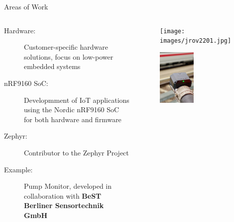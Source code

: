 \documentclass[10pt, aspectratio=169]{beamer}
\begin{document}
\begin{frame}[fragile]{Areas of Work}
  \begin{columns}
    \begin{column}{0.5\textwidth}
      \begin{description}
        \item[Hardware:] Customer-specific hardware solutions, focus on low-power embedded systems
        \item[nRF9160 SoC:] Developmment of IoT applications using the Nordic nRF9160 SoC for both hardware and firmware
        \item[Zephyr:] Contributor to the Zephyr Project
	\item[Example:] Pump Monitor, developed in collaboration with \textbf{BeST Berliner Sensortechnik GmbH}
      \end{description}
    \end{column}
    \begin{column}{0.4\textwidth}
      \begin{figure}
        \texttt{[image: images/jrov2201.jpg]}
      \end{figure}
      \begin{figure}
        \includegraphics[width=0.45\textwidth]{images/jrov2201_housing.png}
      \end{figure}
    \end{column}
  \end{columns}
\end{frame}
\end{document}
